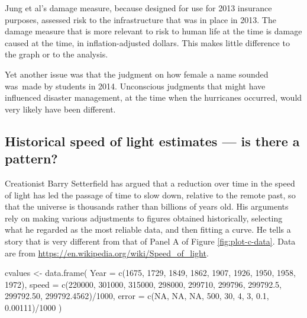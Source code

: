 \documentclass[
  10pt,
  b5paper]{book}
\newenvironment{Shaded}{\begin{snugshade}}{\end{snugshade}}
\newcommand{\AttributeTok}[1]{\textcolor[rgb]{0.77,0.63,0.00}{#1}}
\newcommand{\ConstantTok}[1]{\textcolor[rgb]{0.00,0.00,0.00}{#1}}
\newcommand{\DecValTok}[1]{\textcolor[rgb]{0.00,0.00,0.81}{#1}}
\newcommand{\FloatTok}[1]{\textcolor[rgb]{0.00,0.00,0.81}{#1}}
\newcommand{\FunctionTok}[1]{\textcolor[rgb]{0.00,0.00,0.00}{#1}}
\newcommand{\NormalTok}[1]{#1}
\newcommand{\OtherTok}[1]{\textcolor[rgb]{0.56,0.35,0.01}{#1}}
\newcommand{\SpecialCharTok}[1]{\textcolor[rgb]{0.00,0.00,0.00}{#1}}
\begin{document}
Jung et al's damage measure, because designed for use for 2013
insurance purposes, assessed risk to the infrastructure
that was in place in 2013. The damage measure that is
more relevant to risk to human life at the time is damage caused at
the time, in inflation-adjusted dollars. This makes little
difference to the graph or to the analysis.

Yet another issue was that the judgment on how female a name sounded
was~made by students in 2014. Unconscious judgments that might have
influenced disaster management, at the time when the hurricanes occurred,
would very likely have been different.

\hypertarget{historical-speed-of-light-estimates-is-there-a-pattern}{%
\subsection*{Historical speed of light estimates --- is there a pattern?}\label{historical-speed-of-light-estimates-is-there-a-pattern}}

Creationist Barry Setterfield has argued that a reduction over time
in the speed of light has led the passage of time to slow down,
relative to the remote past, so that the universe is thousands
rather than billions of years old. His arguments rely on
making various adjustments to figures obtained historically,
selecting what he regarded as the most reliable data, and
then fitting a curve. He tells a story that is very different
from that of Panel A of Figure \ref{fig:plot-c-data}.
Data are from \url{https://en.wikipedia.org/wiki/Speed_of_light}.

\begin{Shaded}
\begin{Highlighting}[]
\NormalTok{cvalues }\OtherTok{\textless{}{-}} \FunctionTok{data.frame}\NormalTok{(}
  \AttributeTok{Year =} \FunctionTok{c}\NormalTok{(}\DecValTok{1675}\NormalTok{, }\DecValTok{1729}\NormalTok{, }\DecValTok{1849}\NormalTok{, }\DecValTok{1862}\NormalTok{, }\DecValTok{1907}\NormalTok{, }\DecValTok{1926}\NormalTok{, }\DecValTok{1950}\NormalTok{, }\DecValTok{1958}\NormalTok{, }\DecValTok{1972}\NormalTok{),}
  \AttributeTok{speed =} \FunctionTok{c}\NormalTok{(}\DecValTok{220000}\NormalTok{, }\DecValTok{301000}\NormalTok{, }\DecValTok{315000}\NormalTok{, }\DecValTok{298000}\NormalTok{, }\DecValTok{299710}\NormalTok{, }\DecValTok{299796}\NormalTok{,}
            \FloatTok{299792.5}\NormalTok{, }\FloatTok{299792.50}\NormalTok{, }\FloatTok{299792.4562}\NormalTok{)}\SpecialCharTok{/}\DecValTok{1000}\NormalTok{,}
  \AttributeTok{error =} \FunctionTok{c}\NormalTok{(}\ConstantTok{NA}\NormalTok{, }\ConstantTok{NA}\NormalTok{, }\ConstantTok{NA}\NormalTok{, }\DecValTok{500}\NormalTok{, }\DecValTok{30}\NormalTok{, }\DecValTok{4}\NormalTok{, }\DecValTok{3}\NormalTok{, }\FloatTok{0.1}\NormalTok{, }\FloatTok{0.00111}\NormalTok{)}\SpecialCharTok{/}\DecValTok{1000}
\NormalTok{)}
\end{Highlighting}
\end{Shaded}
\end{document}
